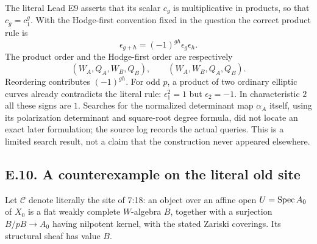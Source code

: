 The literal Lead E9 asserts that its scalar $c_g$ is multiplicative in products, so that $c_g=c_1^g$.  With the Hodge-first convention fixed in the question the correct product rule is
\[
                \epsilon_{g+h}=(-1)^{gh}\epsilon_g\epsilon_h.
\]
The product order and the Hodge-first order are respectively
\[
 (W_A,Q_A,W_B,Q_B),\qquad (W_A,W_B,Q_A,Q_B).
\]
Reordering contributes $(-1)^{gh}$. For odd $p$, a product of two ordinary elliptic curves already contradicts the literal rule: $\epsilon_1^2=1$ but $\epsilon_2=-1$. In characteristic $2$ all these signs are $1$. Searches for the normalized determinant map $\alpha_A$ itself, using its polarization determinant and square-root degree formula, did not locate an exact later formulation; the source log records the actual queries. This is a limited search result, not a claim that the construction never appeared elsewhere.

\subsection{E.10. A counterexample on the literal old site}

Let $\mathcal C$ denote literally the site of 7:18: an object over an affine open $U=\operatorname{Spec} A_0$ of $X_0$ is a flat weakly complete $W$-algebra $B$, together with a surjection $B/pB\to A_0$ having nilpotent kernel, with the stated Zariski coverings.  Its structural sheaf has value $B$.

